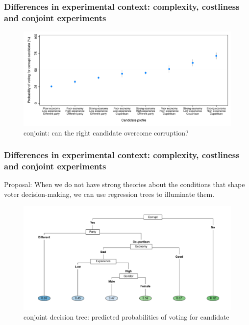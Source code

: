 \documentclass[usenames,dvipsnames]{beamer}
\begin{document}
\begin{frame}[label=b_conjoint]
\frametitle{Differences in experimental context: complexity, costliness and conjoint experiments}

\begin{figure}[!hb]
\centering
\vspace*{-7mm}
\hspace*{-11mm}
\includegraphics[scale = 0.77]{../figs/b_margins.pdf}
\caption{\citet{breitenstein2019choosing} conjoint: can the right candidate overcome corruption?}
\small
\label{fig: b_margins}
\end{figure}

\end{frame}

\begin{frame}
\frametitle{Differences in experimental context: complexity, costliness and conjoint experiments}

\small
\textcolor{Cerulean}{Proposal}: When we do not have strong theories about the conditions that shape voter decision-making, we can use regression trees to illuminate them. 

\begin{figure}[!hb]
\centering
\vspace*{-3mm}
\includegraphics[scale = 0.54]{../figs/b_tree.pdf}
\vspace{-0.2cm}
\caption{\citet{breitenstein2019choosing} conjoint decision tree: predicted probabilities of voting for candidate}
\label{fig: b_tree}
\end{figure}


\end{frame}
\end{document}
